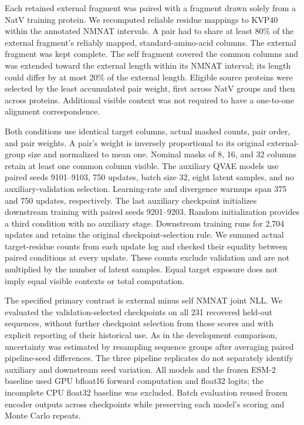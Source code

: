 \documentclass[referee,pdflatex,sn-vancouver-num]{sn-jnl}
\begin{document}
Each retained external fragment was paired with a fragment drawn solely from a NatV training protein. We recomputed reliable residue mappings to KVP40 within the annotated NMNAT intervals. A pair had to share at least 80\% of the external fragment's reliably mapped, standard-amino-acid columns. The external fragment was kept complete. The self fragment covered the common columns and was extended toward the external length within its NMNAT interval; its length could differ by at most 20\% of the external length. Eligible source proteins were selected by the least accumulated pair weight, first across NatV groups and then across proteins. Additional visible context was not required to have a one-to-one alignment correspondence.

Both conditions use identical target columns, actual masked counts, pair order, and pair weights. A pair's weight is inversely proportional to its original external-group size and normalized to mean one. Nominal masks of 8, 16, and 32 columns retain at least one common column visible. The auxiliary QVAE models use paired seeds 9101--9103, 750 updates, batch size 32, eight latent samples, and no auxiliary-validation selection. Learning-rate and divergence warmups span 375 and 750 updates, respectively. The last auxiliary checkpoint initializes downstream training with paired seeds 9201--9203. Random initialization provides a third condition with no auxiliary stage. Downstream training runs for 2,704 updates and retains the original checkpoint-selection rule. We summed actual target-residue counts from each update log and checked their equality between paired conditions at every update. These counts exclude validation and are not multiplied by the number of latent samples. Equal target exposure does not imply equal visible contexts or total computation.

The specified primary contrast is external minus self NMNAT joint NLL. We evaluated the validation-selected checkpoints on all 231 recovered held-out sequences, without further checkpoint selection from those scores and with explicit reporting of their historical use. As in the development comparison, uncertainty was estimated by resampling sequence groups after averaging paired pipeline-seed differences. The three pipeline replicates do not separately identify auxiliary and downstream seed variation. All models and the frozen ESM-2 baseline used GPU bfloat16 forward computation and float32 logits; the incomplete CPU float32 baseline was excluded. Batch evaluation reused frozen encoder outputs across checkpoints while preserving each model's scoring and Monte Carlo repeats.
\end{document}
